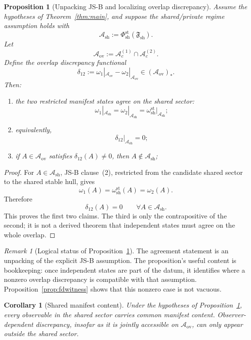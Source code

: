 \documentclass[12pt]{article}
\newtheorem{proposition}[theorem]{Proposition}
\newtheorem{corollary}[theorem]{Corollary}
\theoremstyle{definition}
\theoremstyle{remark}
\newtheorem{remark}[theorem]{Remark}
\begin{document}
\begin{proposition}[Unpacking JS-B and localizing overlap discrepancy]
\label{prop:cpdiscrepancy}
Assume the hypotheses of Theorem~\ref{thm:main}, and suppose the
shared/private regime assumption holds with
\[
\mathcal A_{\mathrm{sh}}
:=
\Phi_{\mathrm{sh}}^{\mathrm{st}}(\mathfrak F_{\mathrm{sh}}).
\]
Let
\[
\mathcal A_{\mathrm{ov}}
:=
\mathcal A_c^{(1)}\cap \mathcal A_c^{(2)}.
\]
Define the overlap discrepancy functional
\[
\delta_{12}
:=
\omega_1|_{\mathcal A_{\mathrm{ov}}}
-
\omega_2|_{\mathcal A_{\mathrm{ov}}}
\in
(\mathcal A_{\mathrm{ov}})_*.
\]
Then:
\begin{enumerate}
\item the two restricted manifest states agree on the shared sector:
  \[
  \omega_1|_{\mathcal A_{\mathrm{sh}}}
  =
  \omega_2|_{\mathcal A_{\mathrm{sh}}}
  =
  \omega_{\mathrm{sh}}^{\mathrm{st}}|_{\mathcal A_{\mathrm{sh}}};
  \]
\item equivalently,
  \[
  \delta_{12}|_{\mathcal A_{\mathrm{sh}}}=0;
  \]
\item if \(A\in\mathcal A_{\mathrm{ov}}\) satisfies
  \(\delta_{12}(A)\neq 0\), then \(A\notin\mathcal A_{\mathrm{sh}}\);
\end{enumerate}
\end{proposition}

\begin{proof}
For \(A\in\mathcal A_{\mathrm{sh}}\), JS-B clause~(2), restricted from
the candidate shared sector to the shared stable hull, gives
\[
\omega_1(A)
=
\omega_{\mathrm{sh}}^{\mathrm{st}}(A)
=
\omega_2(A).
\]
Therefore
\[
\delta_{12}(A)=0
\qquad
\forall A\in\mathcal A_{\mathrm{sh}}.
\]
This proves the first two claims. The third is only the contrapositive of
the second; it is not a derived theorem that independent states must
agree on the whole overlap.
\end{proof}

\begin{remark}[Logical status of
Proposition~\ref{prop:cpdiscrepancy}]
The agreement statement is an unpacking of the explicit JS-B assumption.
The proposition's useful content is bookkeeping: once independent states
are part of the datum, it identifies where a nonzero overlap discrepancy
is compatible with that assumption. Proposition~\ref{prop:fdwitness}
shows that this nonzero case is not vacuous.
\end{remark}

\begin{corollary}[Shared manifest content]
\label{cor:sharedcontent}
Under the hypotheses of Proposition~\ref{prop:cpdiscrepancy}, every
observable in the shared sector carries common manifest content.
Observer-dependent discrepancy, insofar as it is jointly accessible on
\(\mathcal A_{\mathrm{ov}}\), can only appear outside the shared
sector.
\end{corollary}
\end{document}

